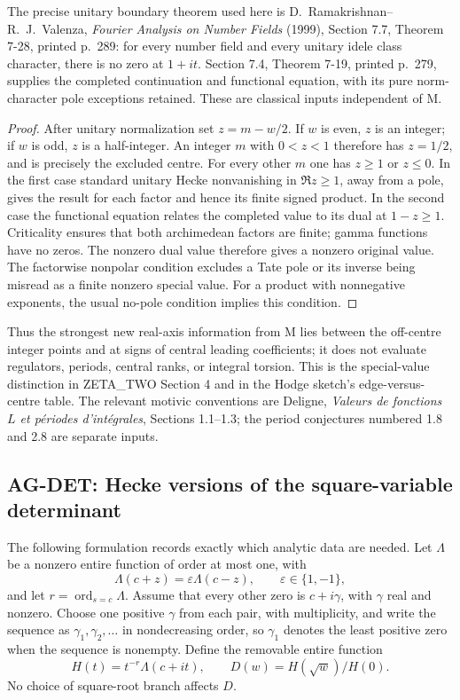 The precise unitary boundary theorem used here is
D.~Ramakrishnan--R.~J.~Valenza, \emph{Fourier Analysis on Number Fields}
(1999), Section 7.7, Theorem 7-28, printed p.~289: for every number
field and every unitary idele class character, there is no zero at
$1+it$. Section 7.4, Theorem 7-19, printed p.~279, supplies the completed
continuation and functional equation, with its pure norm-character pole
exceptions retained. These are classical inputs independent of M.

\begin{proof}
After unitary normalization set $z=m-w/2$. If $w$ is even, $z$ is an
integer; if $w$ is odd, $z$ is a half-integer. An integer $m$ with
$0<z<1$ therefore has $z=1/2$, and is precisely the excluded centre.
For every other $m$ one has $z\ge1$ or $z\le0$. In the first case
standard unitary Hecke nonvanishing in $\Re z\ge1$, away from a pole,
gives the result for each factor and hence its finite signed product.
In the second case the functional equation relates the completed value
to its dual at $1-z\ge1$. Criticality ensures that both archimedean
factors are finite; gamma functions have no zeros. The nonzero dual
value therefore gives a nonzero original value. The factorwise nonpolar
condition excludes a Tate pole or its inverse being misread as a finite
nonzero special value. For a product with nonnegative exponents, the
usual no-pole condition implies this condition.
\end{proof}

Thus the strongest new real-axis information from M lies between the
off-centre integer points and at signs of central leading coefficients;
it does not evaluate regulators, periods, central ranks, or integral
torsion. This is the special-value distinction in ZETA\_TWO Section 4
and in the Hodge sketch's edge-versus-centre table. The relevant motivic
conventions are Deligne, \emph{Valeurs de fonctions $L$ et p\'eriodes
d'int\'egrales}, Sections 1.1--1.3; the period conjectures numbered 1.8
and 2.8 are separate inputs.

\subsection{AG-DET: Hecke versions of the square-variable determinant}
\label{ag:det}

The following formulation records exactly which analytic data are needed.
Let $\Lambda$ be a nonzero entire function of order at most one, with
\[
 \Lambda(c+z)=\varepsilon\Lambda(c-z),\qquad
 \varepsilon\in\{1,-1\},
\]
and let $r=\operatorname{ord}_{s=c}\Lambda$. Assume that every other zero
is $c+i\gamma$, with $\gamma$ real and nonzero. Choose one positive
$\gamma$ from each pair, with multiplicity, and write the sequence as
$\gamma_1,\gamma_2,\ldots$ in nondecreasing order, so $\gamma_1$
denotes the least positive zero when the sequence is nonempty.
Define the removable entire function
\[
 H(t)=t^{-r}\Lambda(c+it),\qquad
 D(w)=H(\sqrt w)/H(0).
\]
No choice of square-root branch affects $D$.

